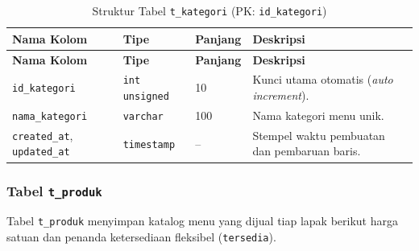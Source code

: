 \renewcommand{\arraystretch}{1.20}
\begin{longtable}{|L{3.85cm}|L{2.4cm}|C{1.65cm}|L{\dimexpr\textwidth-3.85cm-2.4cm-1.65cm-8\arrayrulewidth\relax}|}
\caption{Struktur Tabel \texttt{t\_kategori} (PK: \texttt{id\_kategori})}
\label{tab:skema-kategori} \\
\hline
{}
\textbf{Nama Kolom} & \textbf{Tipe} & \textbf{Panjang} & \textbf{Deskripsi} \\
\hline
\endfirsthead
\hline
{}
\textbf{Nama Kolom} & \textbf{Tipe} & \textbf{Panjang} & \textbf{Deskripsi} \\
\hline
\endhead
\hline
\endfoot
\texttt{id\_kategori} & \texttt{int unsigned} & 10 & Kunci utama otomatis (\textit{auto increment}). \\
\hline
\texttt{nama\_kategori} & \texttt{varchar} & 100 & Nama kategori menu unik. \\
\hline
\texttt{created\_at}, \texttt{updated\_at} & \texttt{timestamp} & -- & Stempel waktu pembuatan dan pembaruan baris. \\
\hline
\end{longtable}

\subsubsection{Tabel \texttt{t\_produk}}
Tabel \texttt{t\_produk} menyimpan katalog menu yang dijual tiap lapak berikut harga satuan dan penanda ketersediaan fleksibel (\texttt{tersedia}).

